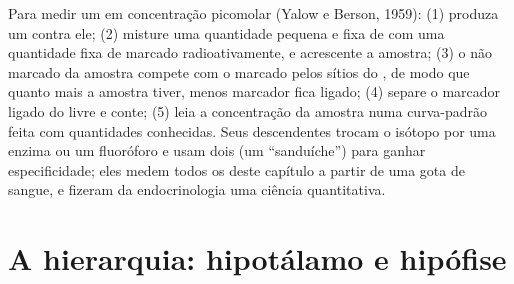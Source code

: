 \begin{method}[Radioimunoensaio]\label{met:b3:endocrinology:ria}
Para medir um  em concentração picomolar (Yalow e Berson,
1959): (1) produza um  contra ele; (2) misture uma quantidade
pequena e fixa de  com uma quantidade fixa de  marcado
radioativamente, e acrescente a amostra; (3) o  não marcado da
amostra compete com o marcado pelos sítios do , de modo que
quanto mais  a amostra tiver, menos marcador fica ligado; (4)
separe o marcador ligado do livre e conte; (5) leia a concentração da
amostra numa curva-padrão feita com quantidades conhecidas. Seus
descendentes trocam o isótopo por uma enzima ou um fluoróforo e usam
dois  (um ``sanduíche'') para ganhar especificidade; eles
medem todos os  deste capítulo a partir de uma gota de sangue,
e fizeram da endocrinologia uma ciência quantitativa.
\end{method}

\section{A hierarquia: hipotálamo e hipófise}

